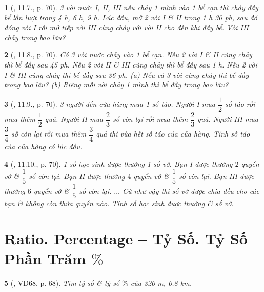 \documentclass{article}
\newtheorem{baitoan}{}
\begin{document}
\begin{baitoan}[\cite{TLCT_THCS_Toan_6_so_hoc}, 11.7., p. 70]
	3 vòi nước I, II, III nếu chảy 1 mình vào 1 bể cạn thì chảy đầy bể lần lượt trong {\rm4 h, 6 h, 9 h}. Lúc đầu, mở 2 vòi I \& II trong {\rm1 h 30 ph}, sau đó đóng vòi I rồi mở tiếp vòi III cùng chảy với vòi II cho đến khi đầy bể. Vòi III chảy trong bao lâu?
\end{baitoan}

\begin{baitoan}[\cite{TLCT_THCS_Toan_6_so_hoc}, 11.8., p. 70]
	Có 3 vòi nước chảy vào 1 bể cạn. Nếu 2 vòi I \& II cùng chảy thì bể đầy sau {\rm45 ph}. Nếu 2 vòi II \& III cùng chảy thì bể đầy sau {\rm1 h}. Nếu 2 vòi I \& III cùng chảy thì bể đầy sau {\rm36 ph}. (a) Nếu cả 3 vòi cùng chảy thì bể đầy trong bao lâu? (b) Riêng mỗi vòi chảy 1 mình thì bể đầy trong bao lâu?
\end{baitoan}

\begin{baitoan}[\cite{TLCT_THCS_Toan_6_so_hoc}, 11.9., p. 70]
	3 người đến cửa hàng mua 1 số táo. Người I mua $\dfrac{1}{2}$ số táo rồi mua thêm $\dfrac{1}{2}$ quả. Người II mua $\dfrac{2}{3}$ số còn lại rồi mua thêm $\dfrac{2}{3}$ quả. Người III mua $\dfrac{3}{4}$ số còn lại rồi mua thêm $\dfrac{3}{4}$ quả thì vừa hết số táo của cửa hàng. Tính số táo của cửa hàng có lúc đầu.
\end{baitoan}

\begin{baitoan}[\cite{TLCT_THCS_Toan_6_so_hoc}, 11.10., p. 70]
	1 số học sinh được thưởng 1 số vở. Bạn I được thưởng $2$ quyển vở \& $\dfrac{1}{5}$ số còn lại. Bạn II được thưởng $4$ quyển vở \& $\dfrac{1}{5}$ số còn lại. Bạn III được thưởng $6$ quyển vở \& $\dfrac{1}{5}$ số còn lại. $\ldots$ Cứ như vậy thì số vở được chia đều cho các bạn \& không còn thừa quyển nào. Tính số học sinh được thưởng \& số vở.
\end{baitoan}


\section{Ratio. Percentage -- Tỷ Số. Tỷ Số Phần Trăm $\%$}

\begin{baitoan}[\cite{Tuyen_Toan_6}, VD68, p. 68]
	Tìm tỷ số \& tỷ số $\%$ của {\rm320 m, 0.8 km}.
\end{baitoan}
\end{document}
